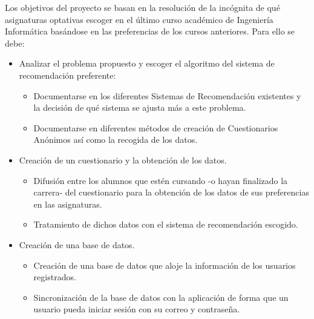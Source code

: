 Los objetivos del proyecto se basan en la resolución de la incógnita de qué asignaturas optativas escoger en el último curso académico de Ingeniería Informática basándose en las preferencias de los cursos anteriores. Para ello se debe: 
\begin{itemize}
\item Analizar el problema propuesto y escoger el algoritmo del sistema de recomendación preferente: 
\begin{itemize}
\item Documentarse en los diferentes Sistemas de Recomendación existentes y la decisión de qué sistema se ajusta más a este problema. 
\item Documentarse en diferentes métodos de creación de Cuestionarios Anónimos así como la recogida de los datos. 
\end{itemize}
\item Creación de un cuestionario y la obtención de los datos. 
\begin{itemize}
\item Difusión entre  los alumnos que estén cursando -o hayan finalizado la carrera- del cuestionario para la obtención de los datos de sus preferencias en las asignaturas. 
\item Tratamiento de dichos datos con el sistema de recomendación escogido.
\end{itemize}
\item Creación de una base de datos. 
\begin{itemize}
\item Creación de una base de datos que aloje la información de los usuarios registrados.
\item Sincronización de la base de datos con la aplicación de forma que un usuario pueda iniciar sesión con su correo y contraseña. 
\end{itemize}
\end{itemize}